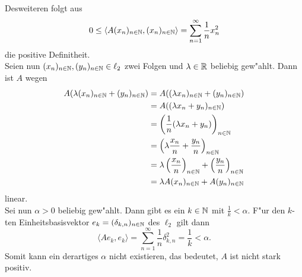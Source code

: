 \begin{itemize}
Desweiteren folgt aus
\[
0 \le \langle A(x_n)_{n\in\mathbb{N}}, (x_n)_{n\in\mathbb{N}} \rangle = \sum_{n=1}^\infty \frac{1}{n}x_n^2
\]
die positive Definitheit. \\

Seien nun $(x_n)_{n\in\mathbb{N}}, (y_n)_{n\in\mathbb{N}}\in\ell_2$ zwei Folgen und $\lambda\in\mathbb{R}$ beliebig gew"ahlt.
Dann ist $A$ wegen
\begin{align*}
A(\lambda(x_n)_{n\in\mathbb{N}}+(y_n)_{n\in\mathbb{N}}) &= A((\lambda x_n)_{n\in\mathbb{N}} + (y_n)_{n\in\mathbb{N}})\\
&= A((\lambda x_n + y_n)_{n\in\mathbb{N}})\\
&= \left(\frac{1}{n} (\lambda x_n + y_n) \right)_{n\in\mathbb{N}}\\
&= \left( \lambda\frac{x_n}{n} + \frac{y_n}{n}\right)_{n\in\mathbb{N}}\\
&= \lambda\left(\frac{x_n}{n}\right)_{n\in\mathbb{N}} + \left(\frac{y_n}{n}\right)_{n\in\mathbb{N}}\\
&= \lambda A(x_n)_{n\in\mathbb{N}} + A(y_n)_{n\in\mathbb{N}}
\end{align*}
linear.\\

Sei nun $\alpha > 0$ beliebig gew"ahlt. Dann gibt es ein $k\in\mathbb{N}$ mit $\frac{1}{k}<\alpha$.
F"ur den $k$-ten Einheitsbasisvektor $e_k=(\delta_{k,n})_{n\in\mathbb{N}}$ des $\ell_2$ gilt dann
\begin{displaymath}
 \langle Ae_k,e_k\rangle=\sum_{n=1}^\infty \frac{1}{n}\delta_{k,n}^2=\frac{1}{k}<\alpha.
\end{displaymath}
Somit kann ein derartiges $\alpha$ nicht existieren, das bedeutet, $A$ ist nicht stark positiv.

\end{itemize}
